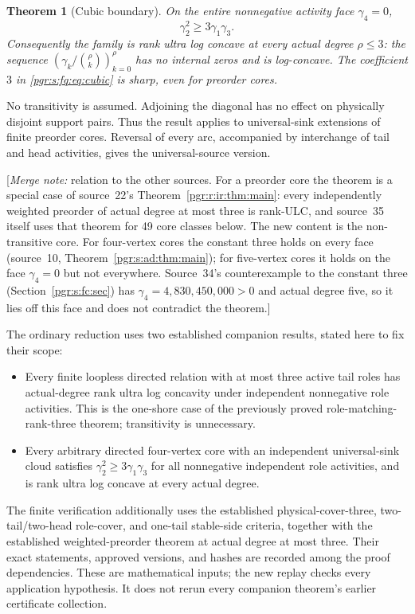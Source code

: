 \documentclass[11pt]{article}
\numberwithin{equation}{section}
\newtheorem{theorem}{Theorem}[section]\newtheorem{lemma}[theorem]{Lemma}\newtheorem{proposition}[theorem]{Proposition}\newtheorem{corollary}[theorem]{Corollary}
\theoremstyle{definition}\newtheorem{definition}[theorem]{Definition}\newtheorem{remark}[theorem]{Remark}
\newcommand{\mnote}[1]{[\textit{Merge note:} #1]}
\begin{document}
\begin{theorem}[Cubic boundary]\label{pgr:s:fq:thm:main}
On the entire nonnegative activity face $\gamma_4=0$,
\begin{equation}\label{pgr:s:fq:eq:cubic}
 \gamma_2^2\ge 3\gamma_1\gamma_3.
\end{equation}
Consequently the family is rank ultra log concave at every actual degree $\rho\le3$: the sequence $(\gamma_k/\binom\rho k)_{k=0}^{\rho}$ has no internal zeros and is log-concave. The coefficient $3$ in \eqref{pgr:s:fq:eq:cubic} is sharp, even for preorder cores.
\end{theorem}

No transitivity is assumed. Adjoining the diagonal has no effect on physically disjoint support pairs. Thus the result applies to universal-sink extensions of finite preorder cores. Reversal of every arc, accompanied by interchange of tail and head activities, gives the universal-source version.

\mnote{relation to the other sources. For a preorder core the theorem is a
special case of source~22's Theorem~\ref{pgr:r:ir:thm:main}: every
independently weighted preorder of actual degree at most three is
rank-ULC, and source~35 itself uses that theorem for 49 core classes
below. The new content is the non-transitive core. For four-vertex cores
the constant three holds on every face (source~10,
Theorem~\ref{pgr:s:ad:thm:main}); for five-vertex cores it holds on the face
$\gamma_4=0$ but not everywhere. Source~34's counterexample to the
constant three (Section~\ref{pgr:s:fc:sec}) has
$\gamma_4=4{,}830{,}450{,}000>0$ and actual degree five, so it lies off this
face and does not contradict the theorem.}

The ordinary reduction uses two established companion results, stated here to fix their scope:
\begin{itemize}
\item[(R3)] Every finite loopless directed relation with at most three active tail roles has actual-degree rank ultra log concavity under independent nonnegative role activities. This is the one-shore case of the previously proved role-matching-rank-three theorem; transitivity is unnecessary.
\item[(C4)] Every arbitrary directed four-vertex core with an independent universal-sink cloud satisfies $\gamma_2^2\ge3\gamma_1\gamma_3$ for all nonnegative independent role activities, and is rank ultra log concave at every actual degree.
\end{itemize}
The finite verification additionally uses the established physical-cover-three, two-tail/two-head role-cover, and one-tail stable-side criteria, together with the established weighted-preorder theorem at actual degree at most three. Their exact statements, approved versions, and hashes are recorded among the proof dependencies. These are mathematical inputs; the new replay checks every application hypothesis. It does not rerun every companion theorem's earlier certificate collection.
\end{document}
